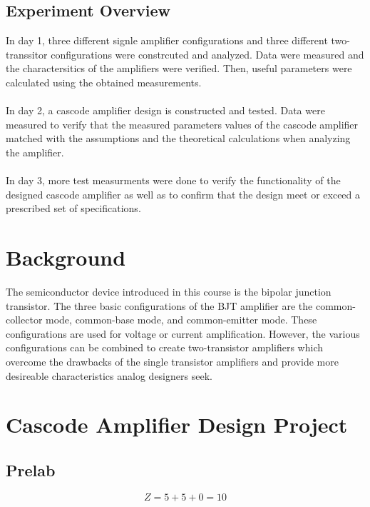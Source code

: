 \documentclass{article}
\begin{document}
	\subsection{Experiment Overview}
	In day 1, three different signle amplifier configurations and three different two-transsitor configurations were constrcuted and analyzed.
	Data were measured and the charactersitics of the amplifiers were verified.
	Then, useful parameters were calculated using the obtained measurements.\\\\
	In day 2, a cascode amplifier design is constructed and tested.
	Data were measured to verify that the measured parameters values of the cascode amplifier matched with the assumptions and the theoretical calculations when analyzing the amplifier.\\\\
	In day 3, more test measurments were done to verify the functionality of the designed cascode amplifier as well as to confirm that the design meet or exceed a prescribed set of specifications.

	\section{Background}
	The semiconductor device introduced in this course is the bipolar junction transistor.
	The three basic configurations of the BJT amplifier are the common-collector mode, common-base mode, and common-emitter mode.
	These configurations are used for voltage or current amplification.
	However, the various configurations can be combined to create two-transistor amplifiers which overcome the drawbacks of the single transistor amplifiers and provide more desireable characteristics analog designers seek.
	
	\pagebreak
	\section{Cascode Amplifier Design Project}
	\subsection{Prelab}
	$$Z = 5  + 5 + 0 = 10$$
\end{document}
